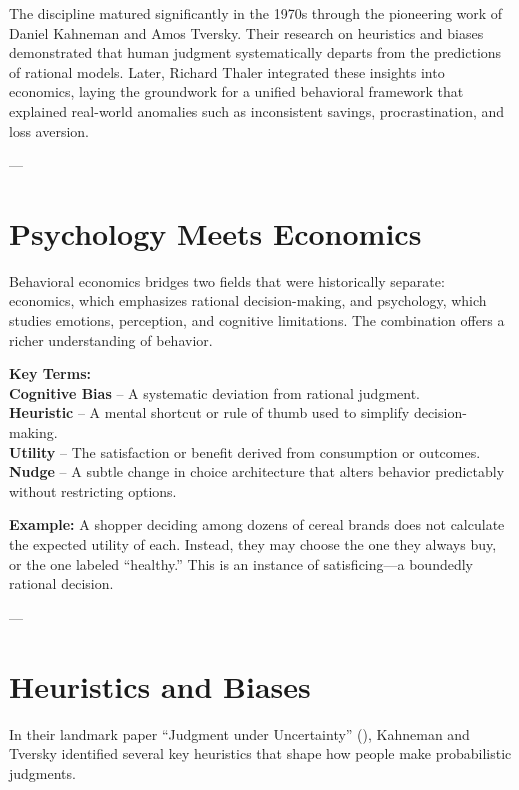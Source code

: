 \documentclass[11pt]{book}
\begin{document}
The discipline matured significantly in the 1970s through the pioneering work of Daniel Kahneman and Amos Tversky. Their research on heuristics and biases demonstrated that human judgment systematically departs from the predictions of rational models. Later, Richard Thaler integrated these insights into economics, laying the groundwork for a unified behavioral framework that explained real-world anomalies such as inconsistent savings, procrastination, and loss aversion.

---

\section*{Psychology Meets Economics}

Behavioral economics bridges two fields that were historically separate: economics, which emphasizes rational decision-making, and psychology, which studies emotions, perception, and cognitive limitations. The combination offers a richer understanding of behavior.

\begin{keytermsbox}
\textbf{Key Terms:} \\
\textbf{Cognitive Bias} – A systematic deviation from rational judgment. \\
\textbf{Heuristic} – A mental shortcut or rule of thumb used to simplify decision-making. \\
\textbf{Utility} – The satisfaction or benefit derived from consumption or outcomes. \\
\textbf{Nudge} – A subtle change in choice architecture that alters behavior predictably without restricting options.
\end{keytermsbox}

\begin{examplebox}
\textbf{Example:} A shopper deciding among dozens of cereal brands does not calculate the expected utility of each. Instead, they may choose the one they always buy, or the one labeled ``healthy.'' This is an instance of satisficing—a boundedly rational decision.
\end{examplebox}

---

\section*{Heuristics and Biases}

In their landmark paper ``Judgment under Uncertainty'' (\citealp{Kahneman1974}), Kahneman and Tversky identified several key heuristics that shape how people make probabilistic judgments.
\end{document}
